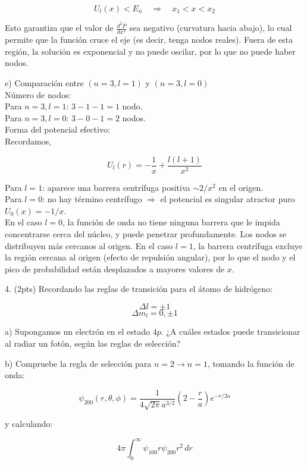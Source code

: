 \documentclass{article}
\theoremstyle{nonumberplain}
\begin{document}
$$
U_l(x) < E_n \quad \Rightarrow \quad x_1 < x < x_2
$$

Esto garantiza que el valor de $\frac{d^2 P}{dx^2}$ sea negativo (curvatura hacia abajo), lo cual permite que la función cruce el eje (es decir, tenga nodos reales). Fuera de esta región, la solución es exponencial y no puede oscilar, por lo que no puede haber nodos.

e) Comparación entre $(n = 3, l = 1)$ y $(n = 3, l = 0)$ \\

 Número de nodos: \\

 Para $n = 3, l = 1$: $3 - 1 - 1 = 1$ nodo. \\
 Para $n = 3, l = 0$: $3 - 0 - 1 = 2$ nodos. \\

 Forma del potencial efectivo: \\

Recordamos,

$$
U_l(r) = -\frac{1}{x} + \frac{l(l+1)}{x^2}
$$

 Para $l = 1$: aparece una barrera centrífuga positiva $\sim 2/x^2$ en el origen. \\
 Para $l = 0$: no hay término centrífugo $\Rightarrow$ el potencial es singular atractor puro $U_0(x) = -1/x$. \\

 En el caso $l = 0$, la función de onda no tiene ninguna barrera que le impida concentrarse cerca del núcleo, y puede penetrar profundamente. Los nodos se distribuyen más cercanos al origen. En el caso $l = 1$, la barrera centrífuga excluye la región cercana al origen (efecto de repulsión angular), por lo que el nodo y el pico de probabilidad están desplazados a mayores valores de $x$.

4. (2pts) Recordando las reglas de transición para el átomo de hidrógeno:

\[
\Delta l = \pm 1
\]
\[
\Delta m_l = 0, \pm 1
\]

a) Supongamos un electrón en el estado \(4p\). ¿A cuáles estados puede transicionar al radiar un fotón, según las reglas de selección?

b) Compruebe la regla de selección para \(n = 2 \to n = 1\), tomando la función de onda:

\[
\psi_{200}(r, \theta, \phi) = \frac{1}{4\sqrt{2\pi} a^{3/2}} \left(2 - \frac{r}{a}\right) e^{-r/2a}
\]

y calculando:

\[
4\pi \int_0^\infty \psi_{100} r \psi_{200} r^2 \, dr
\]
\end{document}

